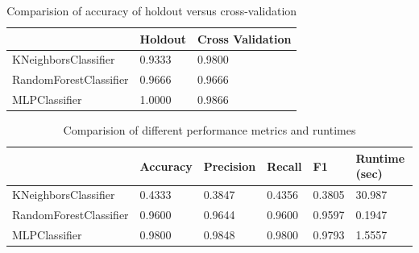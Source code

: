 \begin{table}[H]
\begin{center}
\begin{tabular}{|l|l|l|}
\hline
                       & Holdout & Cross Validation \\ \hline
KNeighborsClassifier   & 0.9333  & 0.9800           \\ \hline
RandomForestClassifier & 0.9666  & 0.9666           \\ \hline
MLPClassifier          & 1.0000  & 0.9866           \\ \hline
\end{tabular}
\caption{Comparision of accuracy of holdout versus cross-validation}
\end{center}
\end{table}

\begin{table}[H]
\begin{center}
\begin{tabular}{|l|l|l|l|l|l|}
\hline
                       & Accuracy & Precision & Recall & F1     & Runtime (sec) \\ \hline
KNeighborsClassifier   & 0.4333   & 0.3847    & 0.4356 & 0.3805 & 30.987        \\ \hline
RandomForestClassifier & 0.9600   & 0.9644    & 0.9600 & 0.9597 & 0.1947        \\ \hline
MLPClassifier          & 0.9800   & 0.9848    & 0.9800 & 0.9793 & 1.5557        \\ \hline
\end{tabular}
\caption{Comparision of different performance metrics and runtimes}
\end{center}
\end{table}

